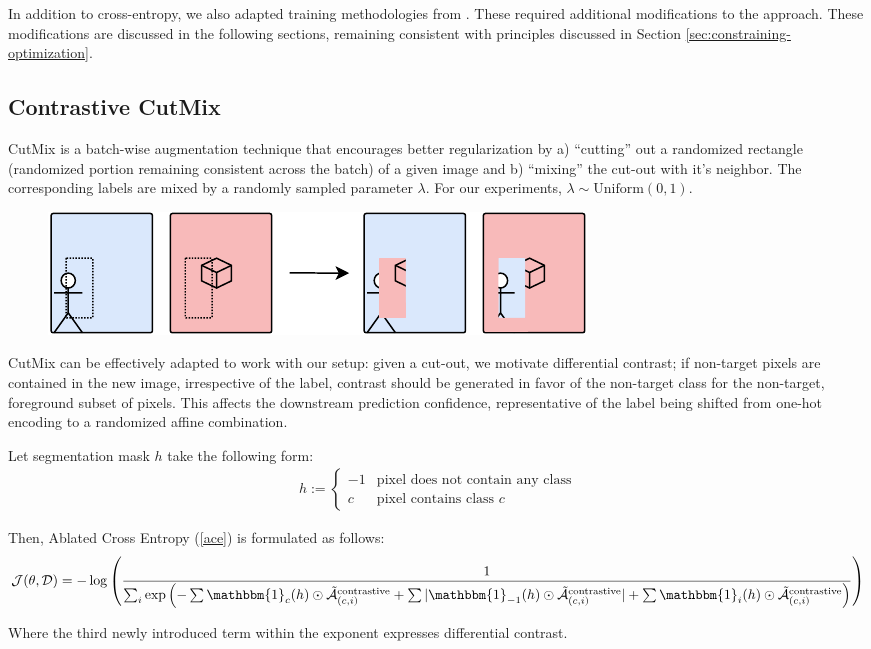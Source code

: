\documentclass{article}
\theoremstyle{plain}
\theoremstyle{definition}
\theoremstyle{remark}
\begin{document}
In addition to cross-entropy, we also adapted training methodologies from \citet{imagenetrecipe}. These required additional modifications to the approach. These modifications are discussed in the following sections, remaining consistent with principles discussed in Section \ref{sec:constraining-optimization}.

\subsection{Contrastive CutMix}

CutMix \citep{yun2019cutmix} is a batch-wise augmentation technique that encourages better regularization by a) ``cutting'' out a randomized rectangle (randomized portion remaining consistent across the batch) of a given image and b) ``mixing'' the cut-out with it's neighbor. The corresponding labels are mixed by a randomly sampled parameter $\lambda$. For our experiments, $\lambda \sim \text{Uniform}(0,1)$.

\begin{figure}[h!]
	\centering
	\includegraphics[width=\textwidth]{img/cutmix}
\end{figure}

CutMix can be effectively adapted to work with our setup: given a cut-out, we motivate differential contrast; if non-target pixels are contained in the new image, irrespective of the label, contrast should be generated in favor of the non-target class for the non-target, foreground subset of pixels. This affects the downstream prediction confidence, representative of the label being shifted from one-hot encoding to a randomized affine combination.

Let segmentation mask $h$ take the following form:
\begin{gather*}
	h := \begin{cases}
		-1 & \text{pixel does not contain any class} \\
		c & \text{pixel contains class } c
	\end{cases}
\end{gather*}

Then, Ablated Cross Entropy (\ref{ace}) is formulated as follows:
\begin{gather}
	\mathcal{J}(\theta, \mathcal{D}) = -\log \left( \frac{1}{\sum_i \text{exp}\left(-\sum \mathbbm{1}_{c}(h) \odot \tilde{\mathcal{\bm{A}}}^{\text{contrastive}}_{(c, i)} + \sum |\mathbbm{1}_{-1}(h) \odot \tilde{\mathcal{\bm{A}}}^{\text{contrastive}}_{(c, i)}| + \sum \mathbbm{1}_{i}(h) \odot \tilde{\mathcal{\bm{A}}}^{\text{contrastive}}_{(c, i)} \right)} \right)
\end{gather}

Where the third newly introduced term within the exponent expresses differential contrast.
\end{document}
